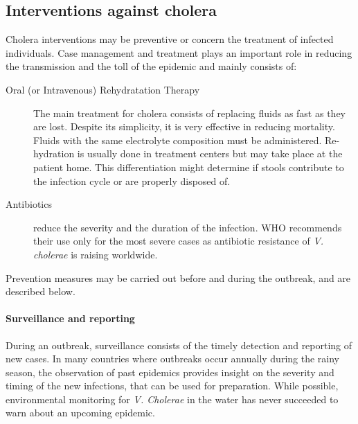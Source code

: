 \subsection{Interventions against cholera} 
Cholera interventions may be preventive or concern the treatment of infected individuals. Case management and treatment plays an important role in reducing the transmission and the toll of the epidemic and mainly consists of:
\begin{description}
\item[Oral (or Intravenous) Rehydratation Therapy] The main treatment for cholera consists of replacing fluids as fast as they are lost. Despite its simplicity, it is very effective in reducing mortality. Fluids with the same electrolyte composition must be administered\cite{Kuhn:GlucoseNotRiceBased:2014}.  Re-hydration is usually done in treatment centers but may take place at the patient home. This differentiation might determine if stools contribute to the infection cycle or are properly disposed of.
\item[Antibiotics] reduce the severity and the duration of the infection. WHO recommends their use only for the most severe cases as antibiotic resistance of \emph{V. cholerae} is raising worldwide\cite{Sack:GettingSeriousCholera:2006}.
\end{description}

Prevention measures may be carried out before and during the outbreak, and are described below.

\paragraph{Surveillance and reporting} During an outbreak, surveillance consists of the timely detection and reporting of new cases. In many countries where outbreaks occur annually during the rainy season, the observation of past epidemics provides insight on the severity and timing of the new infections, that can be used for preparation\cite{Baracchini:SeasonalityCholeraDynamics:2017}. While possible, environmental monitoring for \textit{V. Cholerae} in the water has never succeeded to warn about an upcoming epidemic. 

